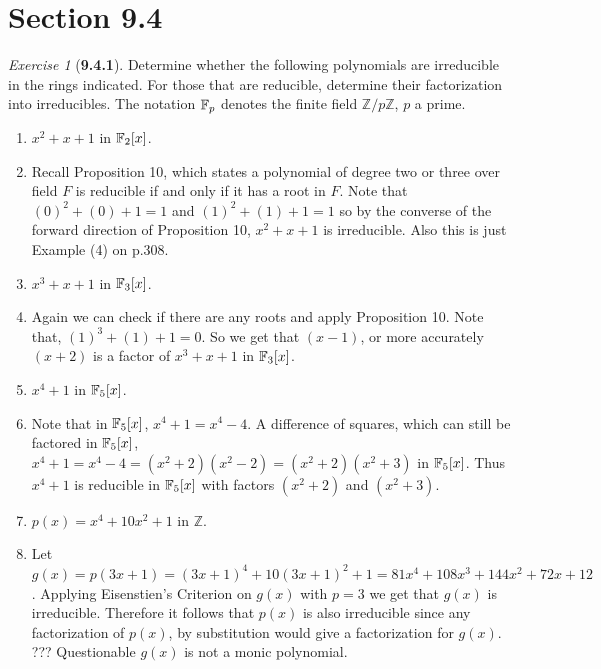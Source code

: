 \documentclass[12pt]{amsart}
\makeatletter
\theoremstyle{remark}
\newtheorem*{exercise}{Exercise}%
\def\ZZ{\ensuremath{\mathbb Z}}
\def\FF{{\ensuremath\mathbb F}}
\renewenvironment{proof}[1][\proofname]{\par\doublespacing
  \pushQED{\qed}%
  \normalfont \topsep6\p@\@plus6\p@\relax
  \list{}{%
    \settowidth{\leftmargin}{\itshape\proofname:\hskip\labelsep}%
    \setlength{\labelwidth}{0pt}%
    \setlength{\itemindent}{-\leftmargin}%
  }%
  \item[\hskip\labelsep\itshape#1\@addpunct{:}]\ignorespaces
}{%
  \popQED\endlist\@endpefalse
  \singlespacing
}
\theoremstyle{mycomment}
\makeatother
\begin{document}
\section*{\textbf{Section 9.4}}

\begin{exercise}[\textbf{9.4.1}] Determine whether the following polynomials are irreducible in the rings indicated. For those that are reducible, determine their factorization into irreducibles. The notation $\FF_p$
  denotes the finite field $\ZZ/p\ZZ$, $p$ a prime.
  \begin{enumerate}
    \item[(a)] $x^2 + x + 1$ in $\FF_2[x]$.
    \begin{proof} Recall Proposition 10, which states a polynomial of degree two or three over field $F$ is reducible if and only if it has a root in $F$. Note that $(0)^2 + (0) + 1 = 1$ and $(1)^2 + (1) + 1 = 1$
      so by the converse of the forward direction of Proposition 10, $x^2 + x + 1$ is irreducible. Also this is just Example (4) on p.308. 
    \end{proof}
    \vspace{.15in}

    \item[(b)] $x^3 + x + 1$ in $\FF_3[x]$.
    \begin{proof} Again we can check if there are any roots and apply Proposition 10. Note that, 
      $(1)^3 + (1) + 1 = 0$. So we get that $(x - 1)$, or more accurately $(x + 2)$ is a factor of  
      $x^3 + x + 1$ in $\FF_3[x]$. 
    \end{proof}
    \vspace{.15in}

    \item[(c)] $x^4 + 1$ in $\FF_5[x]$.
    \begin{proof} Note that in $\FF_5[x]$, $x^4 + 1 = x^4 - 4$. A difference of squares, which can still be factored in $\FF_5[x]$, $x^4 + 1 = x^4 - 4 = (x^2 + 2)(x^2 - 2) = (x^2 + 2)(x^2 + 3)$ in $\FF_5[x]$.
      Thus $x^4 + 1$ is reducible in $\FF_5[x]$ with factors $(x^2 + 2)$ and $(x^2 + 3)$.
    \end{proof}
    \vspace{.15in}


    \item[(d)] $p(x) = x^4 + 10x^2 + 1$ in $\ZZ$.
    \begin{proof} Let $g(x) = p(3x + 1) = (3x + 1)^4 + 10(3x + 1)^2 + 1  = 81 x^4 + 108 x^3 + 144 x^2 + 72 x + 12$. Applying Eisenstien's Criterion on $g(x)$ with $p = 3$ we get that $g(x)$ is irreducible. Therefore it follows that $p(x)$ is also irreducible since any factorization of $p(x)$, by substitution would give a factorization for $g(x)$. ??? Questionable $g(x)$ is not a monic polynomial. 

     \end{proof}

  \end{enumerate}
\end{exercise}
\vspace{.5in}
\end{document}
